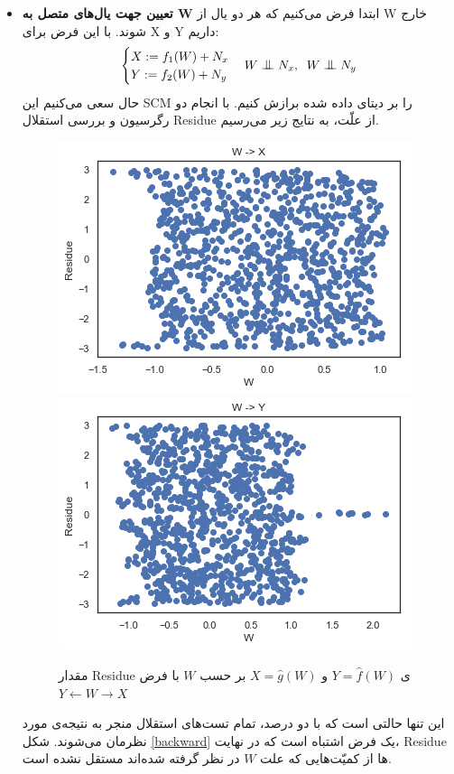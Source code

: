 \documentclass{article}
\begin{document}
\begin{itemize}
\item	\textbf{تعیین جهت یال‌های متصل به W}	
ابتدا فرض می‌کنیم که هر دو یال از W خارج شوند. با این فرض برای X و Y داریم:
$$
\begin{cases}
X := f_1(W) + N_x\\
Y := f_2(W)  + N_y
\end{cases}
W \bigCI N_x, \;\; W \bigCI N_y
$$
حال سعی می‌کنیم این SCM را بر دیتای داده شده برازش کنیم. با انجام دو رگرسیون و بررسی استقلال Residue از علّت، به نتایج زیر می‌رسیم.
\begin{figure}[h]
\centering
\begin{floatrow}
\includegraphics[scale=0.45]{WtoX.png}
\includegraphics[scale=0.45]{WtoY.png}
\end{floatrow}
\caption{
مقدار Residue ی
$ Y=\hat{f}(W) $
و
$ X = \hat{g}(W)$
بر حسب $W$ با فرض
$ Y \leftarrow W \rightarrow X$
}
\label{Forward}
\end{figure}

این تنها حالتی است که با 
دو درصد، تمام تست‌های استقلال منجر به نتیجه‌ی مورد نظرمان می‌شوند. 
شکل
\eqref{backward}
یک فرض اشتباه است که در نهایت، Residue  ها از کمیّت‌هایی که علت ‌$W$ در نظر گرفته شده‌اند مستقل نشده است.


\end{itemize}
\end{document}
